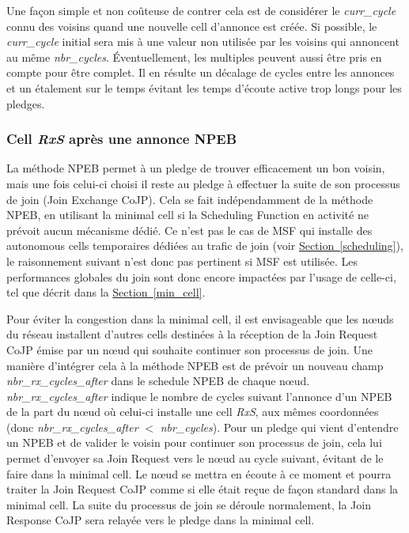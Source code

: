 \documentclass[]{report}
\newcommand{\wordlink}[2]{\hyperref[#2]{#1~\ref{#2}}}
\begin{document}
Une façon simple et non coûteuse de contrer cela est de considérer le \textit{curr\_cycle} connu des voisins quand une nouvelle cell d'annonce est créée. Si possible, le \textit{curr\_cycle} initial sera mis à une valeur non utilisée par les voisins qui annoncent au même \textit{nbr\_cycles}. Éventuellement, les multiples peuvent aussi être pris en compte pour être complet. Il en résulte un décalage de cycles entre les annonces et un étalement sur le temps évitant les temps d'écoute active trop longs pour les pledges.
~\\
\subsubsection{Cell \textit{RxS} après une annonce NPEB}

La méthode NPEB permet à un pledge de trouver efficacement un bon voisin, mais une fois celui-ci choisi il reste au pledge à effectuer la suite de son processus de join (Join Exchange CoJP). Cela se fait indépendamment de la méthode NPEB, en utilisant la minimal cell si la Scheduling Function en activité ne prévoit aucun mécanisme dédié. Ce n'est pas le cas de MSF qui installe des autonomous cells temporaires dédiées au trafic de join (voir \wordlink{Section}{scheduling}), le raisonnement suivant n'est donc pas pertinent si MSF est utilisée. Les performances globales du join sont donc encore impactées par l'usage de celle-ci, tel que décrit dans la \wordlink{Section}{min_cell}.\\

\newpage

Pour éviter la congestion dans la minimal cell, il est envisageable que les nœuds du réseau installent d'autres cells destinées à la réception de la Join Request CoJP émise par un nœud qui souhaite continuer son processus de join. Une manière d'intégrer cela à la méthode NPEB est de prévoir un nouveau champ \textit{nbr\_rx\_cycles\_after} dans le schedule NPEB de chaque nœud. \textit{nbr\_rx\_cycles\_after} indique le nombre de cycles suivant l'annonce d'un NPEB de la part du nœud où celui-ci installe une cell \textit{RxS}, aux mêmes coordonnées (donc \textit{nbr\_rx\_cycles\_after} $<$ \textit{nbr\_cycles}). Pour un pledge qui vient d'entendre un NPEB et de valider le voisin pour continuer son processus de join, cela lui permet d'envoyer sa Join Request vers le nœud au cycle suivant, évitant de le faire dans la minimal cell. Le nœud se mettra en écoute à ce moment et pourra traiter la Join Request CoJP comme si elle était reçue de façon standard dans la minimal cell. La suite du processus de join se déroule normalement, la Join Response CoJP sera relayée vers le pledge dans la minimal cell.\\
\end{document}
